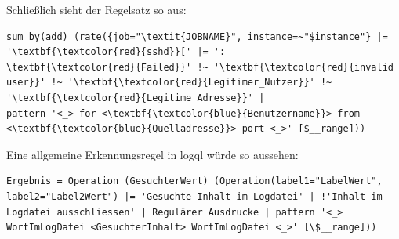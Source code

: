 Schließlich sieht der Regelsatz so aus:

{
\begin{Verbatim}[fontsize=\small, commandchars=\\\{\}, frame=single]
sum by(add) (rate({job="\textit{JOBNAME}", instance=~"$instance"} |= '\textbf{\textcolor{red}{sshd}}[' |= ':
\textbf{\textcolor{red}{Failed}}' !~ '\textbf{\textcolor{red}{invalid user}}' !~ '\textbf{\textcolor{red}{Legitimer_Nutzer}}' !~ '\textbf{\textcolor{red}{Legitime_Adresse}}' |
pattern '<_> for <\textbf{\textcolor{blue}{Benutzername}}> from  <\textbf{\textcolor{blue}{Quelladresse}}> port <_>' [$__range]))
\end{Verbatim}
}


Eine allgemeine Erkennungsregel in \gls{logql} würde so aussehen:
{
\begin{Verbatim}[frame=single]
Ergebnis = Operation (GesuchterWert) (Operation(label1="LabelWert",
label2="Label2Wert") |= 'Gesuchte Inhalt im Logdatei' | !'Inhalt im
Logdatei ausschliessen' | Regulärer Ausdrucke | pattern '<_>
WortImLogDatei <GesuchterInhalt> WortImLogDatei <_>' [\$__range]))
\end{Verbatim}
}





